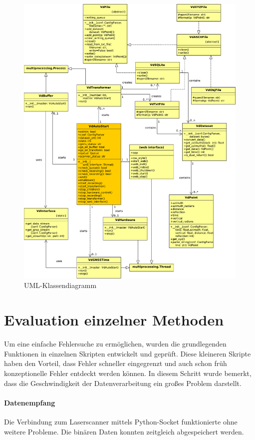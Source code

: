 \documentclass[a4paper,12pt,bibliography=totoc, listof=totoc,titlepage,pointlessnumbers]{scrreprt}
\begin{document}
\begin{figure}[!ht]
 \centering
 \includegraphics[width=1\textwidth]{./img/UML.pdf}
 \caption{UML-Klassendiagramm}
 \label{img:uml}
\end{figure}

\section{Evaluation einzelner Methoden}
Um eine einfache Fehlersuche zu ermöglichen, wurden die grundlegenden Funktionen in einzelnen Skripten entwickelt und geprüft. Diese kleineren Skripte haben den Vorteil, dass Fehler schneller eingegrenzt und auch schon früh konzeptionelle Fehler entdeckt werden können. In diesem Schritt wurde bemerkt, dass die Geschwindigkeit der Datenverarbeitung ein großes Problem darstellt. 

\paragraph{Datenempfang}
Die Verbindung zum Laser\-scan\-ner mittels Python-Socket funktionierte ohne weitere Probleme. Die binären Daten konnten zeitgleich abgespeichert werden.
\end{document}
